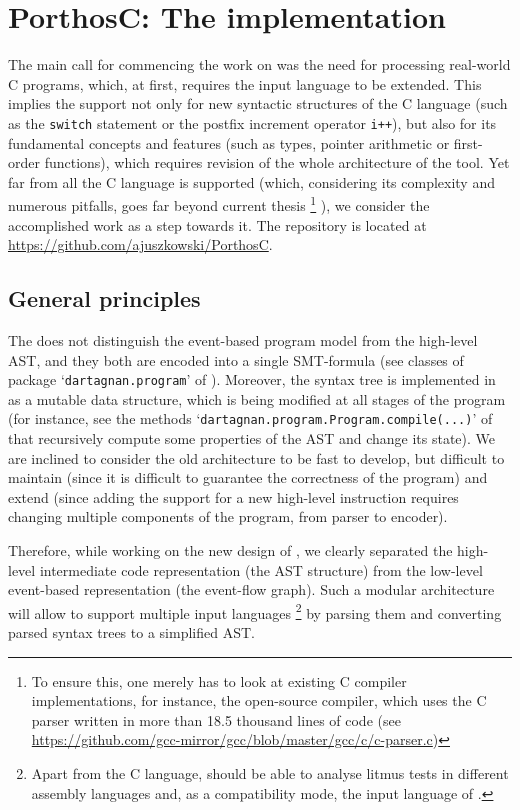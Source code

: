 \chapter{PorthosC: The implementation}
\label{ch:impl}

The main call for commencing the work on \porthos[2] was the need for processing real-world C programs, which, at first, requires the input language to be extended.
This implies the support not only for new syntactic structures of the C language (such as the \texttt{switch} statement or the postfix increment operator \texttt{i++}), but also for its fundamental concepts and features (such as types, pointer arithmetic or first-order functions), which requires revision of the whole architecture of the tool.
Yet far from all the C language is supported (which, considering its complexity and numerous pitfalls, goes far beyond current thesis%
%
\footnote{To ensure this, one merely has to look at existing C compiler implementations, for instance, the open-source  compiler, which uses the C parser written in more than 18.5 thousand lines of code (see \url{https://github.com/gcc-mirror/gcc/blob/master/gcc/c/c-parser.c})}%
%
), we consider the accomplished work as a step towards it.
The \porthos[2] repository is located at \url{https://github.com/ajuszkowski/PorthosC}.


\section{General principles}
\label{ch:impl:principles}

The \porthos[1] does not distinguish the event-based program model from the high-level AST, and they both are encoded into a single SMT-formula (see classes of package `\texttt{dartagnan.program}' of \porthos[1]).
Moreover, the syntax tree is implemented in \porthos[1] as a mutable data structure, which is being modified at all stages of the program (for instance, see the methods `\texttt{dartagnan.program.Program.compile(...)}' of \porthos[1] that recursively compute some properties of the AST and change its state).
We are inclined to consider the old architecture to be fast to develop, but difficult to maintain (since it is difficult to guarantee the correctness of the program) and extend (since adding the support for a new high-level instruction requires changing multiple components of the program, from parser to encoder).

Therefore, while working on the new design of \porthos[2], we clearly separated the high-level intermediate code representation (the AST structure) from the low-level event-based representation (the event-flow graph).
Such a modular architecture will allow to support multiple input languages%
%
\footnote{Apart from the C language, \porthos[2] should be able to analyse litmus tests in different assembly languages and, as a compatibility mode, the input language of \porthos[1].} %
%
by parsing them and converting parsed syntax trees to a simplified AST.

